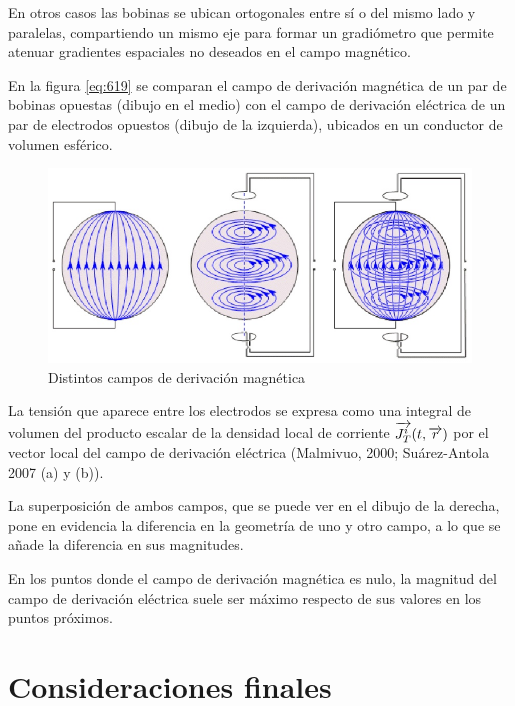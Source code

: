 En otros casos las bobinas se ubican ortogonales entre sí o del mismo lado y paralelas, compartiendo un mismo eje para formar un gradiómetro que permite atenuar gradientes espaciales no deseados en el campo magnético.

En la figura \ref{eq:619} se comparan el campo de derivación magnética de un par de bobinas opuestas (dibujo en el medio) con el campo de derivación eléctrica de un par de electrodos opuestos (dibujo de la izquierda), ubicados en un conductor de volumen esférico.


\begin{figure}[H]
    \centering
    \includegraphics[width=1.0\textwidth]{./Figures/fig619}
	\caption{Distintos campos de derivación magnética}
	\label{fig:619}
\end{figure}

La tensión que aparece entre los electrodos se expresa como una integral de volumen del producto escalar de la densidad local de corriente $\overrightarrow{J^{i}_{T}}(t, \overrightarrow{r})$ por el vector local del campo de derivación eléctrica (Malmivuo, 2000; Suárez-Antola 2007 (a) y (b)).

La superposición de ambos campos, que se puede ver en el dibujo de la derecha, pone en evidencia la diferencia en la geometría de uno y otro campo, a lo que se añade la diferencia en sus magnitudes.

En los puntos donde el campo de derivación magnética es nulo, la magnitud del campo de derivación eléctrica suele ser máximo respecto de sus valores en los puntos próximos.

\section{Consideraciones finales}

